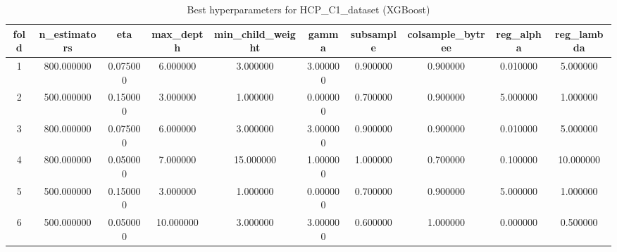 \begin{table}[htbp]
\caption{Best hyperparameters for HCP_C1_dataset (XGBoost)}
\label{tab:best_hyperparams_HCP_C1_dataset}
\begin{tabular}{cccccccccc}
\toprule
fold & n_estimators & eta & max_depth & min_child_weight & gamma & subsample & colsample_bytree & reg_alpha & reg_lambda \\
\midrule
1 & 800.000000 & 0.075000 & 6.000000 & 3.000000 & 3.000000 & 0.900000 & 0.900000 & 0.010000 & 5.000000 \\
2 & 500.000000 & 0.150000 & 3.000000 & 1.000000 & 0.000000 & 0.700000 & 0.900000 & 5.000000 & 1.000000 \\
3 & 800.000000 & 0.075000 & 6.000000 & 3.000000 & 3.000000 & 0.900000 & 0.900000 & 0.010000 & 5.000000 \\
4 & 800.000000 & 0.050000 & 7.000000 & 15.000000 & 1.000000 & 1.000000 & 0.700000 & 0.100000 & 10.000000 \\
5 & 500.000000 & 0.150000 & 3.000000 & 1.000000 & 0.000000 & 0.700000 & 0.900000 & 5.000000 & 1.000000 \\
6 & 500.000000 & 0.050000 & 10.000000 & 3.000000 & 3.000000 & 0.600000 & 1.000000 & 0.000000 & 0.500000 \\
\bottomrule
\end{tabular}
\end{table}
